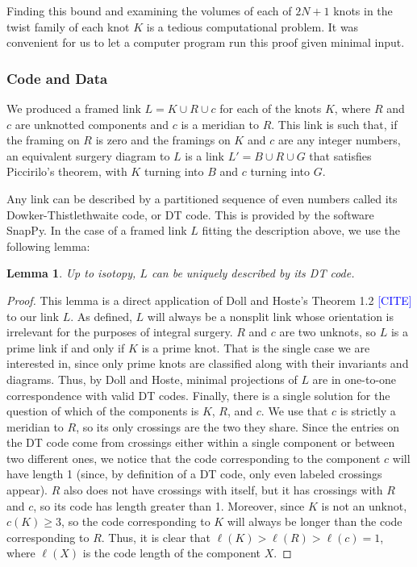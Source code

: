 \documentclass[11pt,usenames,dvipsnames,reqno]{amsart}
\numberwithin{theorem}{section}
\newtheorem{lemma}[theorem]{Lemma}
\theoremstyle{ex}
\theoremstyle{rem}
\def\kh#1{\textcolor{Blue}{#1}}
\begin{document}
Finding this bound and examining the volumes of each of $2 N + 1$ knots in the twist family of each knot $K$ is a tedious computational problem. It was convenient for us to let a computer program run this proof given minimal input.

\subsubsection{Code and Data}\label{sec:code}
We produced a framed link $L = K \cup R \cup c$ for each of the knots $K$, where $R$ and $c$ are unknotted components and $c$ is a meridian to $R$. This link is such that, if the framing on $R$ is zero and the framings on $K$ and $c$ are any integer numbers, an equivalent surgery diagram to $L$ is a link $L' = B \cup R \cup G$ that satisfies Piccirilo's theorem, with $K$ turning into $B$ and $c$ turning into $G$.

Any link can be described by a partitioned sequence of even numbers called its Dowker-Thistlethwaite  code, or DT code. This is provided by the software SnapPy. In the case of a framed link $L$ fitting the description above, we use the following lemma:

\begin{lemma}
	Up to isotopy, $L$ can be uniquely described by its DT code.
\end{lemma}
\begin{proof}
	This lemma is a direct application of Doll and Hoste's Theorem 1.2 \kh{[CITE]} to our link $L$. As defined, $L$ will always be a nonsplit link whose orientation is irrelevant for the purposes of integral surgery. $R$ and $c$ are two unknots, so $L$ is a prime link if and only if $K$ is a prime knot. That is the single case we are interested in, since only prime knots are classified along with their invariants and diagrams. Thus, by Doll and Hoste, minimal projections of $L$ are in one-to-one correspondence with valid DT codes.
	Finally, there is a single solution for the question of which of the components is $K$, $R$, and $c$. We use that $c$ is strictly a meridian to $R$, so its only crossings are the two they share. Since the entries on the DT code come from crossings either within a single component or between two different ones, we notice that the code corresponding to the component $c$ will have length 1 (since, by definition of a DT code, only even labeled crossings appear). $R$ also does not have crossings with itself, but it has crossings with $R$ and $c$, so its code has length greater than 1. Moreover, since $K$ is not an unknot, $c(K) \geq 3$, so the code corresponding to $K$ will always be longer than the code corresponding to $R$. Thus, it is clear that $\ell(K) > \ell(R) > \ell(c) = 1$, where $\ell(X)$ is the code length of the component $X$.
\end{proof}
\end{document}
